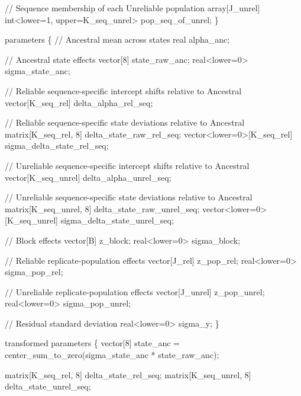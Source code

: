 \documentclass[
]{article}
\newenvironment{Shaded}{\begin{snugshade}}{\end{snugshade}}
\newcommand{\StringTok}[1]{\textcolor[rgb]{0.31,0.60,0.02}{#1}}
\begin{document}
\begin{Shaded}
\begin{Highlighting}[]
\StringTok{  // Sequence membership of each Unreliable population}
\StringTok{  array[J\_unrel] int\textless{}lower=1, upper=K\_seq\_unrel\textgreater{} pop\_seq\_of\_unrel;}
\StringTok{\}}

\StringTok{parameters \{}
\StringTok{  // Ancestral mean across states}
\StringTok{  real alpha\_anc;}

\StringTok{  // Ancestral state effects}
\StringTok{  vector[8] state\_raw\_anc;}
\StringTok{  real\textless{}lower=0\textgreater{} sigma\_state\_anc;}

\StringTok{  // Reliable sequence{-}specific intercept shifts relative to Ancestral}
\StringTok{  vector[K\_seq\_rel] delta\_alpha\_rel\_seq;}

\StringTok{  // Reliable sequence{-}specific state deviations relative to Ancestral}
\StringTok{  matrix[K\_seq\_rel, 8] delta\_state\_raw\_rel\_seq;}
\StringTok{  vector\textless{}lower=0\textgreater{}[K\_seq\_rel] sigma\_delta\_state\_rel\_seq;}

\StringTok{  // Unreliable sequence{-}specific intercept shifts relative to Ancestral}
\StringTok{  vector[K\_seq\_unrel] delta\_alpha\_unrel\_seq;}

\StringTok{  // Unreliable sequence{-}specific state deviations relative to Ancestral}
\StringTok{  matrix[K\_seq\_unrel, 8] delta\_state\_raw\_unrel\_seq;}
\StringTok{  vector\textless{}lower=0\textgreater{}[K\_seq\_unrel] sigma\_delta\_state\_unrel\_seq;}

\StringTok{  // Block effects}
\StringTok{  vector[B] z\_block;}
\StringTok{  real\textless{}lower=0\textgreater{} sigma\_block;}

\StringTok{  // Reliable replicate{-}population effects}
\StringTok{  vector[J\_rel] z\_pop\_rel;}
\StringTok{  real\textless{}lower=0\textgreater{} sigma\_pop\_rel;}

\StringTok{  // Unreliable replicate{-}population effects}
\StringTok{  vector[J\_unrel] z\_pop\_unrel;}
\StringTok{  real\textless{}lower=0\textgreater{} sigma\_pop\_unrel;}

\StringTok{  // Residual standard deviation}
\StringTok{  real\textless{}lower=0\textgreater{} sigma\_y;}
\StringTok{\}}

\StringTok{transformed parameters \{}
\StringTok{  vector[8] state\_anc = center\_sum\_to\_zero(sigma\_state\_anc * state\_raw\_anc);}

\StringTok{  matrix[K\_seq\_rel, 8] delta\_state\_rel\_seq;}
\StringTok{  matrix[K\_seq\_unrel, 8] delta\_state\_unrel\_seq;}


\end{Highlighting}
\end{Shaded}
\end{document}
